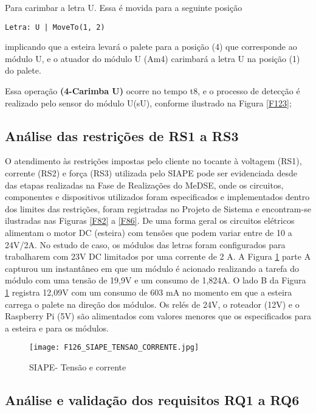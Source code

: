 Para carimbar a letra U. Essa é movida para a seguinte posição
\begin{center}
\texttt{Letra: U | MoveTo(1, 2)}
\end{center}
implicando que a esteira levará o palete para a posição (4) que corresponde ao módulo U, e o atuador do módulo U (Am4) carimbará a letra U na posição (1) do palete. 

Essa operação \textbf{(4-Carimba U)} ocorre no tempo t8, e o processo de detecção é realizado pelo sensor do módulo U(sU), conforme ilustrado na Figura \ref{F123};

		
\subsection{Análise das restrições de RS1 a RS3}	

O atendimento às restrições impostas pelo cliente no tocante à voltagem (RS1), corrente (RS2) e força (RS3) utilizada pelo SIAPE pode ser evidenciada desde das etapas realizadas na Fase de Realizações do MeDSE, onde os circuitos, componentes e dispositivos utilizados foram especificados e implementados dentro dos limites das restrições, foram registradas no Projeto de Sistema e encontram-se ilustradas nas Figuras \ref{F82} a \ref{F86}. De uma forma geral os circuitos elétricos alimentam o motor DC (esteira) com tensões que podem variar entre de 10 a 24V/2A. No estudo de caso, os módulos das letras foram configurados para trabalharem com 23V DC limitados por uma corrente de 2 A. A Figura \ref{F126} parte A capturou um instantâneo em que um módulo é acionado realizando a tarefa do módulo com uma tensão de 19,9V e um consumo de 1,824A.  O lado B da Figura \ref{F126} registra 12,09V com um consumo de 603 mA no momento em que a esteira carrega o palete na direção dos módulos. Os relés de 24V, o roteador (12V) e o Raspberry Pi (5V) são alimentados com valores menores que os especificados para a esteira e para os módulos. 

\begin{figure}[!h]
	\centering
	\texttt{[image: F126\_SIAPE\_TENSAO\_CORRENTE.jpg]} 
	\caption{SIAPE- Tensão e corrente}
	\label{F126}
\end{figure}

\subsection{Análise e validação dos requisitos RQ1 a RQ6}	

